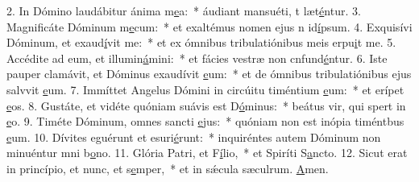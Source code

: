 2. In Dómino laudábitur ánima m\uline{e}a:~* áudiant mansuéti, t læt\uline{é}ntur.
3. Magnificáte Dóminum m\uline{e}cum:~* et exaltémus nomen ejus n id\uline{í}psum.
4. Exquisívi Dóminum, et exaud\uline{í}vit me:~* et ex ómnibus tribulatiónibus meis erpu\uline{i}t me.
5. Accédite ad eum, et illumin\uline{á}mini:~* et fácies vestræ non cnfund\uline{é}ntur.
6. Iste pauper clamávit, et Dóminus exaudívit \uline{e}um:~* et de ómnibus tribulatiónibus ejus salvvit \uline{e}um.
7. Immíttet Angelus Dómini in circúitu timéntium \uline{e}um:~* et erípet \uline{e}os.
8. Gustáte, et vidéte quóniam suávis est D\uline{ó}minus:~* beátus vir, qui spert in \uline{e}o.
9. Timéte Dóminum, omnes sancti \uline{e}jus:~* quóniam non est inópia timéntbus \uline{e}um.
10. Dívites eguérunt et esuri\uline{é}runt:~* inquiréntes autem Dóminum non minuéntur mni b\uline{o}no.
11. Glória Patri, et F\uline{í}lio,~* et Spiríti S\uline{a}ncto.
12. Sicut erat in princípio, et nunc, et s\uline{e}mper,~* et in sǽcula sæculrum. \uline{A}men.
